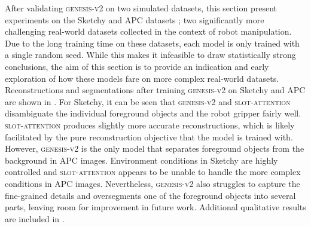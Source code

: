 \documentclass{article}
\begin{document}
After validating \textsc{genesis-v2} on two simulated datasets, this section present experiments on the Sketchy \cite{cabi2019scaling} and APC datasets \cite{zeng2016multi}; two significantly more challenging real-world datasets collected in the context of robot manipulation.
Due to the long training time on these datasets, each model is only trained with a single random seed.
While this makes it infeasible to draw statistically strong conclusions, the aim of this section is to provide an indication and early exploration of how these models fare on more complex real-world datasets.
Reconstructions and segmentations after training \textsc{genesis-v2} on Sketchy and APC are shown in .
For Sketchy, it can be seen that \textsc{genesis-v2} and \textsc{slot-attention} disambiguate the individual foreground objects and the robot gripper fairly well.
\textsc{slot-attention} produces slightly more accurate reconstructions, which is likely facilitated by the pure reconstruction objective that the model is trained with.
However, \textsc{genesis-v2} is the only model that separates foreground objects from the background in APC images.
Environment conditions in Sketchy are highly controlled and \textsc{slot-attention} appears to be unable to handle the more complex conditions in APC images.
Nevertheless, \textsc{genesis-v2} also struggles to capture the fine-grained details and oversegments one of the foreground objects into several parts, leaving room for improvement in future work.
Additional qualitative results are included in .
\end{document}
